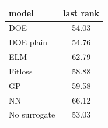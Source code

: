 \begin{tabular}{|lc|}
\hline
model & last rank\\
\hline
DOE & 54.03 \\
DOE plain & 54.76 \\
ELM & 62.79 \\
Fitloss & 58.88 \\
GP & 59.58 \\
NN & 66.12 \\
No surrogate & 53.03 \\
\hline
\end{tabular}
